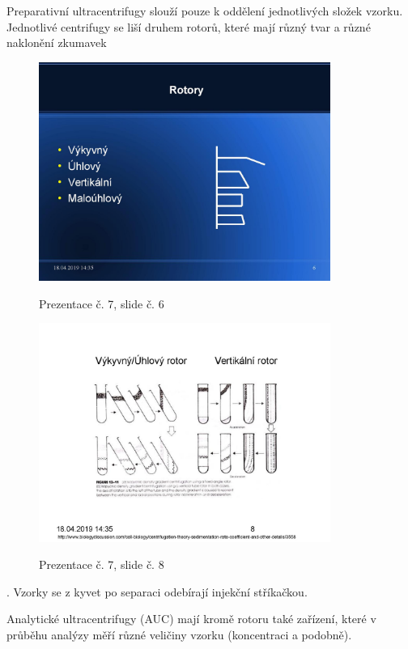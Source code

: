 \documentclass[DIV=8]{scrreprt}
\begin{document}
Preparativní ultracentrifugy slouží pouze k oddělení jednotlivých složek vzorku. Jednotlivé centrifugy se liší druhem rotorů, které mají různý tvar a různé naklonění zkumavek \begin{figure}
    \caption{Prezentace č. 7, slide č. 6}
    \includegraphics[width=0.85\textwidth]{slides-7/slide-6.jpg}
    \centering
    \label{slides-7-slide-6}
\end{figure}
\begin{figure}
    \caption{Prezentace č. 7, slide č. 8}
    \includegraphics[width=0.85\textwidth]{slides-7/slide-8.jpg}
    \centering
    \label{slides-7-slide-8}
\end{figure}
. Vzorky se z kyvet po separaci odebírají injekční stříkačkou.

Analytické ultracentrifugy (AUC) mají kromě rotoru také zařízení, které v průběhu analýzy měří různé veličiny vzorku (koncentraci a podobně).
\end{document}
